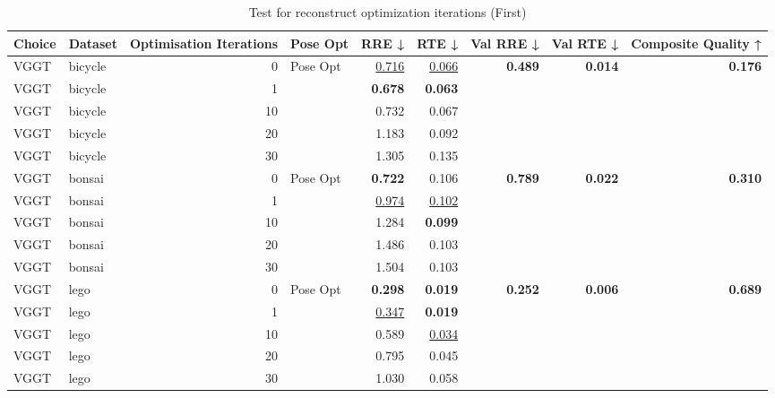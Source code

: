 \begin{table}[H]
\caption{Test for reconstruct optimization iterations (First)}
\label{tab:99_optimisation_iterations_first}
\centering
\scriptsize
\begin{tabular}{llrlrrrrr}
\toprule
Choice & Dataset & Optimisation Iterations & Pose Opt & RRE ↓ & RTE ↓ & Val RRE ↓ & Val RTE ↓ & Composite Quality ↑ \\
\midrule
VGGT & bicycle & 0 & Pose Opt & \underline{0.716} & \underline{0.066} & \textbf{0.489} & \textbf{0.014} & \textbf{0.176} \\
VGGT & bicycle & 1 &  & \textbf{0.678} & \textbf{0.063} &  &  &  \\
VGGT & bicycle & 10 &  & 0.732 & 0.067 &  &  &  \\
VGGT & bicycle & 20 &  & 1.183 & 0.092 &  &  &  \\
VGGT & bicycle & 30 &  & 1.305 & 0.135 &  &  &  \\
\midrule
VGGT & bonsai & 0 & Pose Opt & \textbf{0.722} & 0.106 & \textbf{0.789} & \textbf{0.022} & \textbf{0.310} \\
VGGT & bonsai & 1 &  & \underline{0.974} & \underline{0.102} &  &  &  \\
VGGT & bonsai & 10 &  & 1.284 & \textbf{0.099} &  &  &  \\
VGGT & bonsai & 20 &  & 1.486 & 0.103 &  &  &  \\
VGGT & bonsai & 30 &  & 1.504 & 0.103 &  &  &  \\
\midrule
VGGT & lego & 0 & Pose Opt & \textbf{0.298} & \textbf{0.019} & \textbf{0.252} & \textbf{0.006} & \textbf{0.689} \\
VGGT & lego & 1 &  & \underline{0.347} & \textbf{0.019} &  &  &  \\
VGGT & lego & 10 &  & 0.589 & \underline{0.034} &  &  &  \\
VGGT & lego & 20 &  & 0.795 & 0.045 &  &  &  \\
VGGT & lego & 30 &  & 1.030 & 0.058 &  &  &  \\
\bottomrule
\end{tabular}
\end{table}